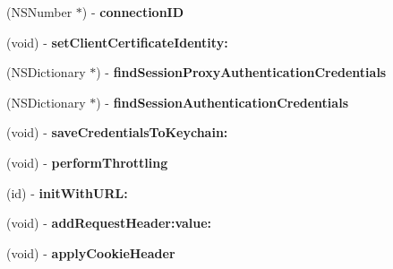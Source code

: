 \begin{DoxyCompactItemize}
\item 
\hypertarget{interface_a_s_i_h_t_t_p_request_a3e06c0a51784d32cc8198f616e63c530}{
(\-N\-S\-Number $\ast$) -\/ {\bfseries connection\-I\-D}}
\label{interface_a_s_i_h_t_t_p_request_a3e06c0a51784d32cc8198f616e63c530}

\item 
\hypertarget{interface_a_s_i_h_t_t_p_request_a4f24e48396e06b8a81de111e19c1314a}{
(void) -\/ {\bfseries set\-Client\-Certificate\-Identity\-:}}
\label{interface_a_s_i_h_t_t_p_request_a4f24e48396e06b8a81de111e19c1314a}

\item 
\hypertarget{interface_a_s_i_h_t_t_p_request_a480d62ba0d9ba8d1a64b25b45fb2d965}{
(\-N\-S\-Dictionary $\ast$) -\/ {\bfseries find\-Session\-Proxy\-Authentication\-Credentials}}
\label{interface_a_s_i_h_t_t_p_request_a480d62ba0d9ba8d1a64b25b45fb2d965}

\item 
\hypertarget{interface_a_s_i_h_t_t_p_request_a0f38ffc0ae199e83262895f640c9c263}{
(\-N\-S\-Dictionary $\ast$) -\/ {\bfseries find\-Session\-Authentication\-Credentials}}
\label{interface_a_s_i_h_t_t_p_request_a0f38ffc0ae199e83262895f640c9c263}

\item 
\hypertarget{interface_a_s_i_h_t_t_p_request_a3a57684f5aba49781ec3c9c9ef1516a6}{
(void) -\/ {\bfseries save\-Credentials\-To\-Keychain\-:}}
\label{interface_a_s_i_h_t_t_p_request_a3a57684f5aba49781ec3c9c9ef1516a6}

\item 
\hypertarget{interface_a_s_i_h_t_t_p_request_a510b47cc1be0b9c1968a9c8cc3859038}{
(void) -\/ {\bfseries perform\-Throttling}}
\label{interface_a_s_i_h_t_t_p_request_a510b47cc1be0b9c1968a9c8cc3859038}

\item 
\hypertarget{interface_a_s_i_h_t_t_p_request_aec75eeba26544a9da35e795011fe4a42}{
(id) -\/ {\bfseries init\-With\-U\-R\-L\-:}}
\label{interface_a_s_i_h_t_t_p_request_aec75eeba26544a9da35e795011fe4a42}

\item 
\hypertarget{interface_a_s_i_h_t_t_p_request_a0e969f091acb07bbbe6dbc9295260d64}{
(void) -\/ {\bfseries add\-Request\-Header\-:value\-:}}
\label{interface_a_s_i_h_t_t_p_request_a0e969f091acb07bbbe6dbc9295260d64}

\item 
\hypertarget{interface_a_s_i_h_t_t_p_request_a96645d25afb711168d8722089ad0da60}{
(void) -\/ {\bfseries apply\-Cookie\-Header}}
\label{interface_a_s_i_h_t_t_p_request_a96645d25afb711168d8722089ad0da60}


\end{DoxyCompactItemize}
